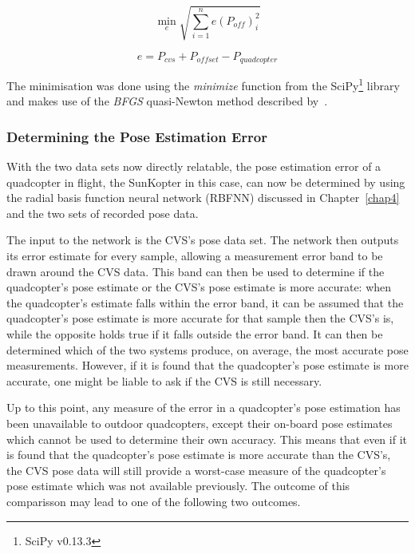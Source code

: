 \begin{equation}
  \label{eq:chap5-err-func}
  \min_{e}\sqrt{\displaystyle\sum_{i=1}^{n} e(P_{off})_i^2}
\end{equation}

\begin{equation}
  \label{eq:chap5-err-term}
  e = P_{cvs} + P_{offset} - P_{quadcopter}
\end{equation}

The minimisation was done using the \emph{minimize} function from the SciPy\footnote{SciPy v0.13.3} library and makes use of the \emph{BFGS} quasi-Newton method described by~\cite{nocedal2006numerical}. 

\subsubsection{Determining the Pose Estimation Error}

With the two data sets now directly relatable, the pose estimation error of a quadcopter in flight, the SunKopter in this case, can now be determined by using the radial basis function neural network (RBFNN) discussed in Chapter~\ref{chap4} and the two sets of recorded pose data.  

The input to the network is the CVS's pose data set. The network then outputs its error estimate for every sample, allowing a measurement error band to be drawn around the CVS data. This band can then be used to determine if the quadcopter's pose estimate or the CVS's pose estimate is more accurate: when the quadcopter's estimate falls within the error band, it can be assumed that the quadcopter's pose estimate is more accurate for that sample then the CVS's is, while the opposite holds true if it falls outside the error band. It can then be determined which of the two systems produce, on average, the most accurate pose measurements. However, if it is found that the quadcopter's pose estimate is more accurate, one might be liable to ask if the CVS is still necessary.

Up to this point, any measure of the error in a quadcopter's pose estimation has been unavailable to outdoor quadcopters, except their on-board pose estimates which cannot be used to determine their own accuracy. This means that even if it is found that the quadcopter's pose estimate is more accurate than the CVS's, the CVS pose data will still provide a worst-case measure of the quadcopter's pose estimate which was not available previously. The outcome of this comparisson may lead to one of the following two outcomes.

